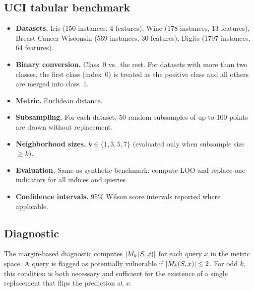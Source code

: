 \subsection{UCI tabular benchmark}

\begin{itemize}
\item \textbf{Datasets.}  Iris (150 instances, 4 features), Wine (178
    instances, 13 features), Breast Cancer Wisconsin (569 instances, 30
    features), Digits (1797 instances, 64 features).
\item \textbf{Binary conversion.}  Class~0 vs.\ the rest.  For datasets with
    more than two classes, the first class (index~0) is treated as the positive
    class and all others are merged into class~1.
\item \textbf{Metric.}  Euclidean distance.
\item \textbf{Subsampling.}  For each dataset, 50 random subsamples of up to
    100 points are drawn without replacement.
\item \textbf{Neighborhood sizes.}  $k \in \{1,3,5,7\}$ (evaluated only when
    subsample size $\ge k$).
\item \textbf{Evaluation.}  Same as synthetic benchmark: compute LOO and
    replace-one indicators for all indices and queries.
\item \textbf{Confidence intervals.}  95\% Wilson score intervals reported
    where applicable.
\end{itemize}

\subsection{Diagnostic}

The margin-based diagnostic computes $|M_k(S,x)|$ for each query $x$ in the
metric space.  A query is flagged as potentially vulnerable if
$|M_k(S,x)| \le 2$.  For odd $k$, this condition is both necessary and
sufficient for the existence of a single replacement that flips the prediction
at $x$.

